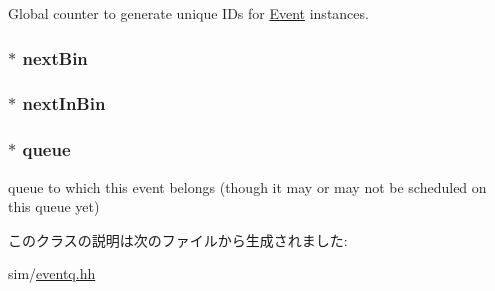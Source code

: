 Global counter to generate unique IDs for \hyperlink{classEvent}{Event} instances. \hypertarget{classEvent_a31312157f348cb35f2532b4caa29f7f1}{
\subsubsection[{nextBin}]{$\ast$ {\bf nextBin}}}
\label{classEvent_a31312157f348cb35f2532b4caa29f7f1}
\hypertarget{classEvent_a825f3555ba76a30dca432425e0901143}{
\subsubsection[{nextInBin}]{$\ast$ {\bf nextInBin}}}
\label{classEvent_a825f3555ba76a30dca432425e0901143}
\hypertarget{classEvent_a4c802add2830eb8f234f8dd788b4a588}{
\subsubsection[{queue}]{$\ast$ {\bf queue}}}
\label{classEvent_a4c802add2830eb8f234f8dd788b4a588}
queue to which this event belongs (though it may or may not be scheduled on this queue yet) 

このクラスの説明は次のファイルから生成されました:\begin{DoxyCompactItemize}
\item 
sim/\hyperlink{eventq_8hh}{eventq.hh}\end{DoxyCompactItemize}
